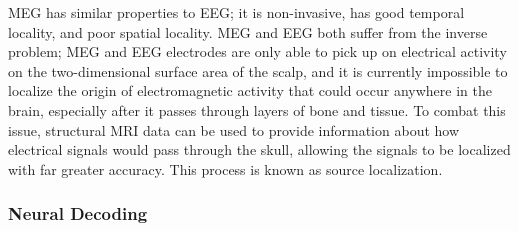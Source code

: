 \documentclass[../main.tex]{subfiles}
\begin{document}
MEG has similar properties to EEG; it is non-invasive, has good temporal locality, and poor spatial locality. MEG and EEG both suffer from the inverse problem; MEG and EEG electrodes are only able to pick up on electrical activity on the two-dimensional surface area of the scalp, and it is currently impossible to localize the origin of electromagnetic activity that could occur anywhere in the brain, especially after it passes through layers of bone and tissue. To combat this issue, structural MRI data can be used to provide information about how electrical signals would pass through the skull, allowing the signals to be localized with far greater accuracy. This process is known as source localization.

\subsubsection{Neural Decoding}
\citep{mne}
\end{document}

